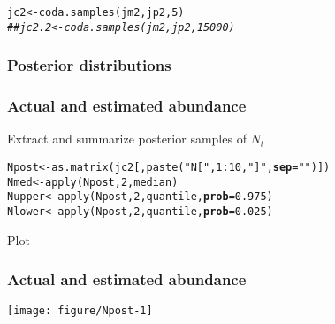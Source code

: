 \documentclass[color=usenames,dvipsnames]{beamer}\usepackage[]{graphicx}\usepackage[]{color}
\makeatletter
\newcommand{\hlnum}[1]{\textcolor[rgb]{0.69,0.494,0}{#1}}%
\newcommand{\hlstr}[1]{\textcolor[rgb]{0.749,0.012,0.012}{#1}}%
\newcommand{\hlcom}[1]{\textcolor[rgb]{0.514,0.506,0.514}{\textit{#1}}}%
\newcommand{\hlopt}[1]{\textcolor[rgb]{0,0,0}{#1}}%
\newcommand{\hlstd}[1]{\textcolor[rgb]{0,0,0}{#1}}%
\newcommand{\hlkwb}[1]{\textcolor[rgb]{0,0.341,0.682}{#1}}%
\newcommand{\hlkwc}[1]{\textcolor[rgb]{0,0,0}{\textbf{#1}}}%
\newcommand{\hlkwd}[1]{\textcolor[rgb]{0.004,0.004,0.506}{#1}}%
\newenvironment{kframe}{%
 \def\at@end@of@kframe{}%
 \ifinner\ifhmode%
  \def\at@end@of@kframe{\end{minipage}}%
  \begin{minipage}{\columnwidth}%
 \fi\fi%
 \def\FrameCommand##1{\hskip\@totalleftmargin \hskip-\fboxsep
 \colorbox{shadecolor}{##1}\hskip-\fboxsep
     \hskip-\linewidth \hskip-\@totalleftmargin \hskip\columnwidth}%
 \MakeFramed {\advance\hsize-\width
   \@totalleftmargin\z@ \linewidth\hsize
   \@setminipage}}%
 {\par\unskip\endMakeFramed%
 \at@end@of@kframe}
\newenvironment{knitrout}{}{} %
\makeatother
\begin{document}
\begin{frame}[fragile]
\begin{knitrout}
\begin{kframe}
{\ttfamily\noindent{}}\begin{alltt}
\hlstd{jc2} \hlkwb{<-} \hlkwd{coda.samples}\hlstd{(jm2, jp2,} \hlnum{5}\hlstd{)}
\hlcom{##jc2.2 <- coda.samples(jm2, jp2, 15000)}
\end{alltt}
\end{kframe}
\end{knitrout}
\end{frame}




\begin{frame}[fragile]
  \frametitle{Posterior distributions}

\begin{center}
\end{center}
\end{frame}










\begin{frame}[fragile]
  \frametitle{Actual and estimated abundance}
  {Extract and summarize posterior samples of $N_t$}
  \footnotesize
\begin{knitrout}
\color{fgcolor}\begin{kframe}
\begin{alltt}
\hlstd{Npost} \hlkwb{<-} \hlkwd{as.matrix}\hlstd{(jc2[,}\hlkwd{paste}\hlstd{(}\hlstr{"N["}\hlstd{,} \hlnum{1}\hlopt{:}\hlnum{10}\hlstd{,} \hlstr{"]"}\hlstd{,} \hlkwc{sep}\hlstd{=}\hlstr{""}\hlstd{)])}
\hlstd{Nmed} \hlkwb{<-} \hlkwd{apply}\hlstd{(Npost,} \hlnum{2}\hlstd{, median)}
\hlstd{Nupper} \hlkwb{<-} \hlkwd{apply}\hlstd{(Npost,} \hlnum{2}\hlstd{, quantile,} \hlkwc{prob}\hlstd{=}\hlnum{0.975}\hlstd{)}
\hlstd{Nlower} \hlkwb{<-} \hlkwd{apply}\hlstd{(Npost,} \hlnum{2}\hlstd{, quantile,} \hlkwc{prob}\hlstd{=}\hlnum{0.025}\hlstd{)}
\end{alltt}
\end{kframe}
\end{knitrout}
  \pause
  \vfill
  {\normalsize Plot}

\end{frame}





\begin{frame}
  \frametitle{Actual and estimated abundance}
  \vspace{-4mm}
  \begin{center}
    \texttt{[image: figure/Npost-1]}
  \end{center}
\end{frame}
\end{document}
